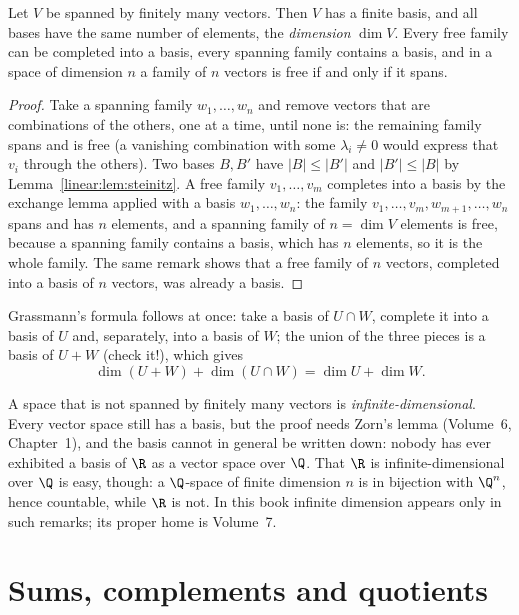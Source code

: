 \begin{theorem}[dimension]\label{linear:thm:dim}
Let $V$ be spanned by finitely many vectors. Then $V$ has a finite basis, and all bases have the same number of elements,
the \emph{dimension} $\dim V$. Every free family can be completed into a basis, every spanning family contains a basis,
and in a space of dimension $n$ a family of $n$ vectors is free if and only if it spans.
\end{theorem}
\begin{proof}
Take a spanning family $w_1,\dots,w_n$ and remove vectors that are combinations of the others, one at a time, until none
is: the remaining family spans and is free (a vanishing combination with some $\lambda_i\ne0$ would express that $v_i$
through the others). Two bases $B,B'$ have $|B|\le|B'|$ and $|B'|\le|B|$ by Lemma~\ref{linear:lem:steinitz}. A free family
$v_1,\dots,v_m$ completes into a basis by the exchange lemma applied with a basis $w_1,\dots,w_n$: the family
$v_1,\dots,v_m,w_{m+1},\dots,w_n$ spans and has $n$ elements, and a spanning family of $n=\dim V$ elements is free,
because a spanning family contains a basis, which has $n$ elements, so it is the whole family. The same remark shows that
a free family of $n$ vectors, completed into a basis of $n$ vectors, was already a basis.
\end{proof}

Grassmann's formula follows at once: take a basis of $U\cap W$, complete it into a basis of $U$ and, separately, into a
basis of $W$; the union of the three pieces is a basis of $U+W$ (check it!), which gives
\[
\dim(U+W)+\dim(U\cap W)=\dim U+\dim W.
\]

\begin{remark}
A space that is not spanned by finitely many vectors is \emph{infinite-dimensional}. Every vector space still has a
basis, but the proof needs Zorn's lemma (Volume~6, Chapter~1), and the basis cannot in general be written down: nobody
has ever exhibited a basis of $\R$ as a vector space over $\Q$. That $\R$ is infinite-dimensional over $\Q$ is easy,
though: a $\Q$-space of finite dimension $n$ is in bijection with $\Q^n$, hence countable, while $\R$ is not. In this
book infinite dimension appears only in such remarks; its proper home is Volume~7.
\end{remark}

\section{Sums, complements and quotients}\label{linear:sec:quotients}

